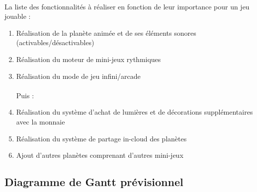 \paragraph{}
La liste des fonctionnalités à réaliser en fonction de leur importance pour un jeu jouable :
\begin{enumerate}
\item Réalisation de la planète animée et de ses éléments sonores (activables/désactivables)
\item Réalisation du moteur de mini-jeux rythmiques
\item Réalisation du mode de jeu infini/arcade
\\\\Puis :
\item Réalisation du système d’achat de lumières et de décorations supplémentaires avec la monnaie
\item Réalisation du système de partage in-cloud des planètes
\item Ajout d’autres planètes comprenant d’autres mini-jeux
\end{enumerate}

\subsection{Diagramme de Gantt prévisionnel}
